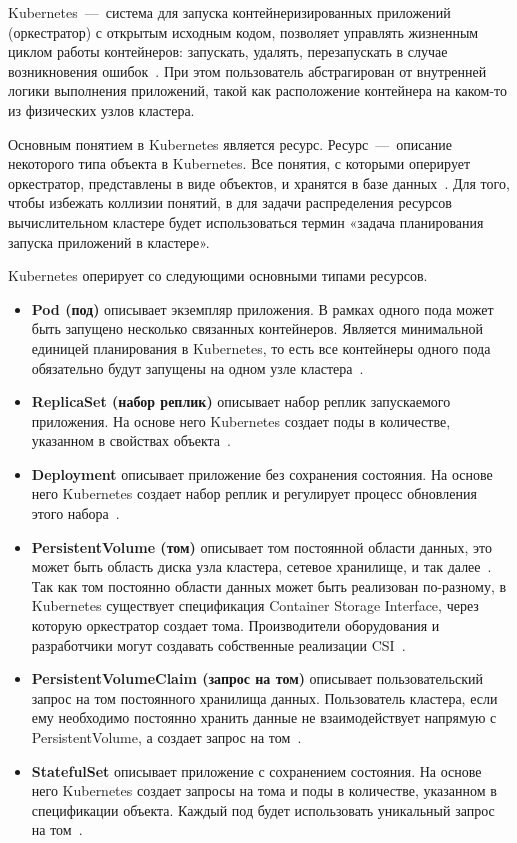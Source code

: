 Kubernetes~---~система для запуска контейнеризированных приложений (оркестратор) с открытым исходным кодом, позволяет управлять жизненным циклом работы контейнеров: запускать, удалять, перезапускать в случае возникновения ошибок~\cite{kubernetes}. При этом пользователь абстрагирован от внутренней логики выполнения приложений, такой как расположение контейнера на каком-то из физических узлов кластера.

Основным понятием в Kubernetes является ресурс. Ресурс~---~описание некоторого типа объекта в Kubernetes. Все понятия, с которыми оперирует оркестратор, представлены в виде объектов, и хранятся в базе данных~\cite{kubernetesresources}. Для того, чтобы избежать коллизии понятий, в для задачи распределения ресурсов вычислительном кластере будет использоваться термин «задача планирования запуска приложений в кластере».

Kubernetes оперирует со следующими основными типами ресурсов.

\begin{itemize}
	\item \textbf{Pod (под)} описывает экземпляр приложения. В рамках одного пода может быть запущено несколько связанных контейнеров. Является минимальной единицей планирования в Kubernetes, то есть все контейнеры одного пода обязательно будут запущены на одном узле кластера~\cite{pods}.
	\item \textbf{ReplicaSet (набор реплик)} описывает набор реплик запускаемого приложения. На основе него Kubernetes создает поды в количестве, указанном в свойствах объекта~\cite{rs}.
	\item \textbf{Deployment} описывает приложение без сохранения состояния. На основе него Kubernetes создает набор реплик и регулирует процесс обновления этого набора~\cite{deploy}.
	\item \textbf{PersistentVolume (том)} описывает том постоянной области данных, это может быть область диска узла кластера, сетевое хранилище, и так далее~\cite{pv}. Так как том постоянно области данных может быть реализован по-разному, в Kubernetes существует спецификация Container Storage Interface, через которую оркестратор создает тома. Производители оборудования и разработчики могут создавать собственные реализации CSI~\cite{csi}.
	\item \textbf{PersistentVolumeClaim (запрос на том)} описывает пользовательский запрос на том постоянного хранилища данных. Пользователь кластера, если ему необходимо постоянно хранить данные не взаимодействует напрямую с PersistentVolume, а создает запрос на том~\cite{pv}.
	\item \textbf{StatefulSet} описывает приложение с сохранением состояния. На основе него Kubernetes создает запросы на тома и поды в количестве, указанном в спецификации объекта. Каждый под будет использовать уникальный запрос на том~\cite{sts}.
\end{itemize}

